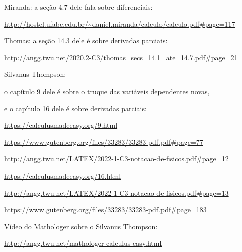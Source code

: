 \documentclass[oneside,12pt]{article}
\begin{document}
{{Miranda: a seção 4.7 dele fala sobre diferenciais:

{\scriptsize

\url{http://hostel.ufabc.edu.br/~daniel.miranda/calculo/calculo.pdf\#page=117}

}


\msk

Thomas: a seção 14.3 dele é sobre derivadas parciais:

{\scriptsize

\url{http://angg.twu.net/2020.2-C3/thomas_secs_14.1_ate_14.7.pdf\#page=21}

}

\msk

Silvanus Thompson:

o capítulo 9 dele é sobre o truque das variáveis dependentes novas,

e o capítulo 16 dele é sobre derivadas parciais:

{\scriptsize

\url{https://calculusmadeeasy.org/9.html}

\url{https://www.gutenberg.org/files/33283/33283-pdf.pdf\#page=77}

\url{http://angg.twu.net/LATEX/2022-1-C3-notacao-de-fisicos.pdf\#page=12}

\ssk

\url{https://calculusmadeeasy.org/16.html}

\url{http://angg.twu.net/LATEX/2022-1-C3-notacao-de-fisicos.pdf\#page=13}

\url{https://www.gutenberg.org/files/33283/33283-pdf.pdf\#page=183}

}

\msk

Vídeo do Mathologer sobre o Silvanus Thompson:

{\scriptsize

\url{http://angg.twu.net/mathologer-calculus-easy.html}

}

}\anothercol{
}}
\end{document}
